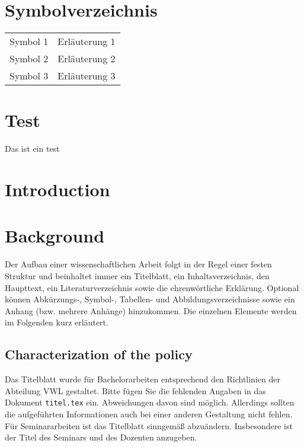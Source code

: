 \documentclass{scrbook}
\begin{document}
\listoffigures

\listoftables

\chapter*{Symbolverzeichnis}\label{sv}
\begin{tabular}{ll}
Symbol 1 & Erläuterung 1 \\
Symbol 2 & Erläuterung 2\\
Symbol 3 & Erläuterung 3\\
\end{tabular}
 
\mainmatter

\chapter{Test}

Das ist ein test

\chapter{Introduction}

\chapter{Background}

Der Aufbau einer wissenschaftlichen Arbeit folgt in der Regel einer festen Struktur und beinhaltet immer ein Titelblatt, ein Inhaltsverzeichnis, den Haupttext, ein Literaturverzeichnis sowie die ehrenwörtliche Erklärung. Optional können Abkürzungs-, Symbol-, Tabellen- und Abbildungsverzeichnisse sowie ein Anhang (bzw. mehrere Anhänge) hinzukommen. Die einzelnen Elemente werden im Folgenden kurz erläutert.

\section{Characterization of the policy}
Das Titelblatt wurde für Bachelorarbeiten entsprechend den Richtlinien der Abteilung VWL gestaltet. Bitte fügen Sie die fehlenden Angaben in das Dokument \texttt{titel.tex} ein. Abweichungen davon sind möglich. Allerdings sollten die aufgeführten Informationen auch bei einer anderen Gestaltung nicht fehlen. Für Seminararbeiten ist das Titelblatt sinngemäß abzuändern. Insbesondere ist der Titel des Seminars und des Dozenten anzugeben.
\end{document}
